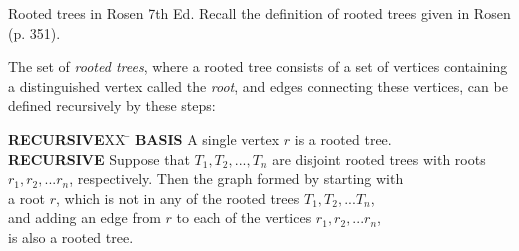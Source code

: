 \begin{wideslide}[bm=,toc=]{Rooted trees in Rosen 7th Ed.}
  Recall the definition of rooted trees given in Rosen (p. 351).
  
  The set of \emph{rooted trees}, where a rooted tree consists of a set of
  vertices containing a distinguished vertex called the \emph{root}, and
  edges connecting these vertices, can be defined recursively by these steps:
  
  \begin{tabbing}
  {\bf RECURSIVE}XX \=  \kill
  {\bf BASIS} \>
           A single vertex $r$ is a rooted tree.\\[2ex]
  {\bf RECURSIVE} \>
          Suppose that $T_1,T_2,...,T_n$ are disjoint rooted trees with roots\\
  {\bf } \>
          $r_1,r_2,...r_n$, respectively. Then the graph formed by starting with\\
  {\bf } \>
          a root $r$, which is not in any of the rooted trees $T_1,T_2,...T_n$,\\
  {\bf } \>
          and adding an edge from $r$ to each of the vertices $r_1,r_2,...r_n$, \\
  {\bf } \>
          is also a rooted tree.\\[2ex] \\
\end{tabbing}
\end{wideslide}

